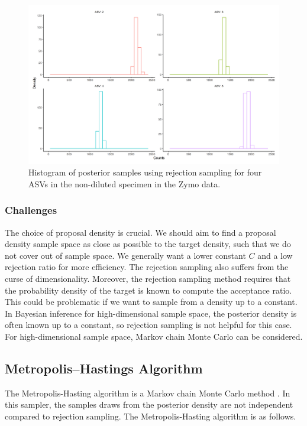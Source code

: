 \documentclass[12pt]{article}
\begin{document}
\begin{figure}[H]
	\centering
	\includegraphics[width=\textwidth]{rejection_sampling.png}
	\caption{Histogram of posterior samples using rejection sampling for four ASVs in the non-diluted specimen in the Zymo data.}
	\label{fig:rs}     
\end{figure}

\subsubsection{Challenges}
The choice of proposal density is crucial. We should aim to find a proposal density sample space as close as possible to the target density, such that we do not cover out of sample space. We generally want a lower constant $C$ and a low rejection ratio for more efficiency. The rejection sampling also suffers from the curse of dimensionality. Moreover, the rejection sampling method requires that the probability density of the target is known to compute the acceptance ratio. This could be problematic if we want to sample from a density up to a constant. In Bayesian inference for high-dimensional sample space, the posterior density is often known up to a constant, so rejection sampling is not helpful for this case. For high-dimensional sample space, Markov chain Monte Carlo can be considered. 

\subsection{Metropolis–Hastings Algorithm}

The Metropolis-Hasting algorithm is a Markov chain Monte Carlo method \citep{hastings1970monte}. In this sampler, the samples draws from the posterior density are not independent compared to rejection sampling. The Metropolis-Hasting algorithm is as follows.
\end{document}
